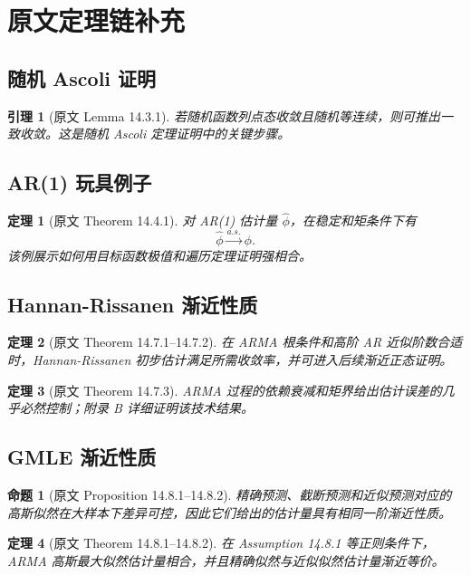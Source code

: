 \documentclass[11pt,a4paper]{ctexart}
\newtheorem{theorem}{定理}[section]
\newtheorem{lemma}{引理}[section]
\newtheorem{proposition}{命题}[section]
\begin{document}
\section{原文定理链补充}

\subsection{随机 Ascoli 证明}
\begin{lemma}[原文 Lemma 14.3.1]
若随机函数列点态收敛且随机等连续，则可推出一致收敛。这是随机 Ascoli 定理证明中的关键步骤。
\end{lemma}

\subsection{AR(1) 玩具例子}
\begin{theorem}[原文 Theorem 14.4.1]
对 AR(1) 估计量 \(\hat\phi\)，在稳定和矩条件下有
\[
  \hat\phi\xrightarrow{a.s.}\phi.
\]
该例展示如何用目标函数极值和遍历定理证明强相合。
\end{theorem}

\subsection{Hannan-Rissanen 渐近性质}
\begin{theorem}[原文 Theorem 14.7.1--14.7.2]
在 ARMA 根条件和高阶 AR 近似阶数合适时，Hannan-Rissanen 初步估计满足所需收敛率，并可进入后续渐近正态证明。
\end{theorem}

\begin{theorem}[原文 Theorem 14.7.3]
ARMA 过程的依赖衰减和矩界给出估计误差的几乎必然控制；附录 B 详细证明该技术结果。
\end{theorem}

\subsection{GMLE 渐近性质}
\begin{proposition}[原文 Proposition 14.8.1--14.8.2]
精确预测、截断预测和近似预测对应的高斯似然在大样本下差异可控，因此它们给出的估计量具有相同一阶渐近性质。
\end{proposition}

\begin{theorem}[原文 Theorem 14.8.1--14.8.2]
在 Assumption 14.8.1 等正则条件下，ARMA 高斯最大似然估计量相合，并且精确似然与近似似然估计量渐近等价。
\end{theorem}
\end{document}
